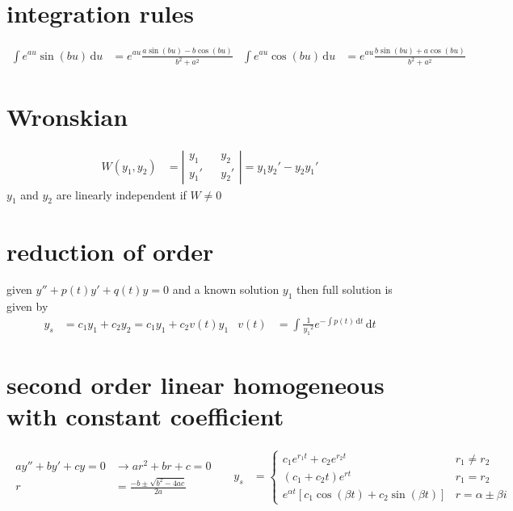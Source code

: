 \documentclass{article}
\newcommand{\abs}[1]{\left\lvert #1 \right\rvert}
\begin{document}
\section*{integration rules}
\begin{align*}
	\int{e^{au}\sin(bu)\,\mathrm{d}u}&=e^{au}\frac{a\sin(bu)-b\cos(bu)}{b^2+a^2} &
	\int{e^{au}\cos(bu)\,\mathrm{d}u}&=e^{au}\frac{b\sin(bu)+a\cos(bu)}{b^2+a^2}
\end{align*}

\section*{Wronskian}
\begin{align*}
	W(y_1,y_2)&=\abs{
	\begin{aligned}
	y_1&&y_2\\
	y_1'&&y_2'
	\end{aligned}
	}=y_1y_2'-y_2y_1'
\end{align*}
$y_1$ and $y_2$ are linearly independent if $W\neq0$

\section*{reduction of order}
given $y''+p(t)y'+q(t)y=0$ and a known solution $y_1$ then full solution is given by
\begin{align*}
	y_s&=c_1y_1+c_2y_2=c_1y_1+c_2v(t)y_1 & v(t)&=\int{\frac{1}{{y_1}^2}e^{-\int{p(t)\,\mathrm{d}t}}\,\mathrm{d}t}
\end{align*}

\section*{second order linear homogeneous with constant coefficient}
\begin{align*}
\begin{aligned}
	ay''+by'+cy=0&\rightarrow ar^2+br+c=0 \\
	r&=\frac{-b\pm\sqrt{b^2-4ac}}{2a} 
\end{aligned}&&
	y_s&=
	\begin{cases}
		c_1e^{r_1t}+c_2e^{r_2t} & r_1\neq r_2\\
		(c_1+c_2t)e^{rt} & r_1=r_2\\
		e^{\alpha t}\left[c_1\cos(\beta t)+c_2\sin(\beta t)\right] & r=\alpha\pm\beta i
	\end{cases}
\end{align*}
\end{document}
